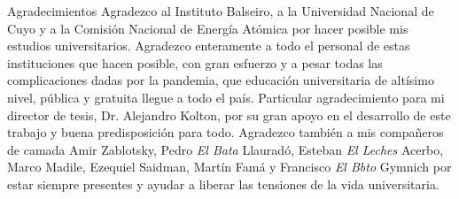 \documentclass[12pt,screen,twoside]{ibtesis}
\begin{document}
\begin{postliminary}
\begin{seccion}{Agradecimientos}
Agradezco al Instituto Balseiro, a la Universidad Nacional de Cuyo y a la Comisión Nacional de Energía Atómica por hacer posible mis estudios universitarios. 
Agradezco enteramente a todo el personal de estas instituciones que hacen posible, con gran esfuerzo y a pesar todas las complicaciones dadas por la pandemia, que 
educación universitaria de altísimo nivel, pública y gratuita llegue a todo el país. Particular agradecimiento para mi director de tesis, Dr. Alejandro Kolton, 
por su gran apoyo en el desarrollo de este trabajo y buena predisposición para todo. Agradezco también a mis compañeros de camada Amir Zablotsky, Pedro \textit{El Bata}
Llauradó, Esteban \textit{El Leches} Acerbo, Marco Madile, Ezequiel Saidman, Martín Famá y Francisco \textit{El Bbto} Gymnich por estar siempre presentes y ayudar a 
liberar las tensiones de la vida universitaria.
\end{seccion}
\end{postliminary}
\end{document}
